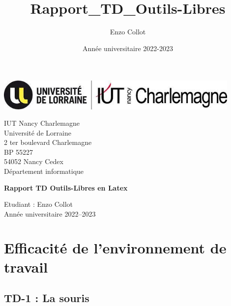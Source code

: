 \documentclass[12pt]{article}
\title{Rapport_TD_Outils-Libres}
\author{Enzo Collot}
\date{Année universitaire 2022-2023}
\begin{document}
    \thispagestyle{empty}
    \begin{center}
        \includegraphics[width=12cm]{Images-TD-Env-Efficiency/Image-TD-1/logo_iut.jpg}
        \end{center}

\vspace{1cm}

\noindent
{\large
  IUT Nancy Charlemagne\\
  Université de Lorraine\\
  2 ter boulevard Charlemagne\\
  BP 55227\\
  54052 Nancy Cedex\\[5mm]
  Département informatique
}

\vspace{5cm}

\begin{center}
    {\huge
      \textbf{Rapport TD Outils-Libres en Latex}
    }
\end{center}

\vspace{5cm}

\vfill


{\Large
  \noindent
  Etudiant : Enzo Collot\\
  Année universitaire 2022--2023
}

\newpage
\thispagestyle{empty}
\mbox{}
\newpage

\newpage
\tableofcontents


\newpage

\section{Efficacité de l'environnement de travail}

  \subsection{TD-1 : La souris}
\end{document}
